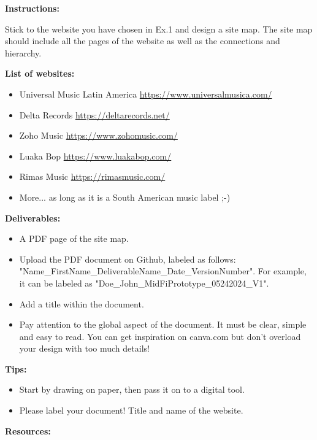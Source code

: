\makeheaderfiles

\textbf{Instructions:}

Stick to the website you have chosen in Ex.1 and design a site map. The site map should include all the pages of the website as well as the connections and hierarchy.

\textbf{List of websites:}

\begin{itemize}
\item Universal Music Latin America \url{https://www.universalmusica.com/}
\item Delta Records \url{https://deltarecords.net/}
\item Zoho Music \url{https://www.zohomusic.com/}
\item Luaka Bop \url{https://www.luakabop.com/}
\item Rimas Music \url{https://rimasmusic.com/}
\item More... as long as it is a South American music label ;-)
\end{itemize}

\textbf{Deliverables:}

\begin{itemize}
\item A PDF page of the site map.
\item Upload the PDF document on Github, labeled as follows: "Name\_FirstName\_DeliverableName\_Date\_VersionNumber". For example, it can be labeled as "Doe\_John\_MidFiPrototype\_05242024\_V1".
\item Add a title within the document.
\item Pay attention to the global aspect of the document. It must be clear, simple and easy to read. You can get inspiration on canva.com but don't overload your design with too much details!
\end{itemize}

\textbf{Tips:}

\begin{itemize}
\item Start by drawing on paper, then pass it on to a digital tool.
\item Please label your document! Title and name of the website.
\end{itemize}

\textbf{Resources:}

